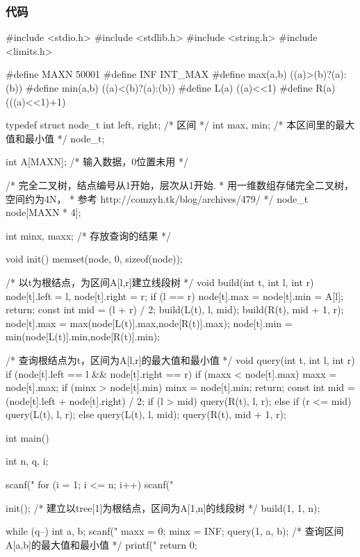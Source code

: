 \subsubsection{代码}
\begin{Codex}[label=balanced_lineup.c]
#include <stdio.h>
#include <stdlib.h>
#include <string.h>
#include <limits.h>

#define MAXN 50001
#define INF INT_MAX
#define max(a,b) ((a)>(b)?(a):(b))
#define min(a,b) ((a)<(b)?(a):(b))
#define L(a) ((a)<<1)
#define R(a) (((a)<<1)+1)

typedef struct node_t {
    int left, right;  /* 区间  */
    int max, min;  /* 本区间里的最大值和最小值 */
} node_t;

int A[MAXN]; /* 输入数据，0位置未用 */

/* 完全二叉树，结点编号从1开始，层次从1开始.
 * 用一维数组存储完全二叉树，空间约为4N，
 * 参考 http://comzyh.tk/blog/archives/479/
 */
node_t node[MAXN * 4];

int minx, maxx; /* 存放查询的结果 */

void init() {
    memset(node, 0, sizeof(node));
}

/* 以t为根结点，为区间A[l,r]建立线段树 */
void build(int t, int l, int r) {
    node[t].left = l, node[t].right = r;
    if (l == r) {
        node[t].max = node[t].min = A[l];
        return;
    }
    const int mid = (l + r) / 2;
    build(L(t), l, mid);
    build(R(t), mid + 1, r);
    node[t].max = max(node[L(t)].max,node[R(t)].max);
    node[t].min = min(node[L(t)].min,node[R(t)].min);
}

/* 查询根结点为t，区间为A[l,r]的最大值和最小值 */
void query(int t, int l, int r) {
    if (node[t].left == l && node[t].right == r) {
        if (maxx < node[t].max)
            maxx = node[t].max;
        if (minx > node[t].min)
            minx = node[t].min;
        return;
    }
    const int mid = (node[t].left + node[t].right) / 2;
    if (l > mid) {
        query(R(t), l, r);
    } else if (r <= mid) {
        query(L(t), l, r);
    } else {
        query(L(t), l, mid);
        query(R(t), mid + 1, r);
    }
}

int main() {
    int n, q, i;

    scanf("%
    for (i = 1; i <= n; i++) scanf("%

    init();
    /* 建立以tree[1]为根结点，区间为A[1,n]的线段树 */
    build(1, 1, n);

    while (q--) {
        int a, b;
        scanf("%
        maxx = 0;
        minx = INF;
        query(1, a, b); /* 查询区间A[a,b]的最大值和最小值 */
        printf("%
    }
    return 0;
}
\end{Codex}

